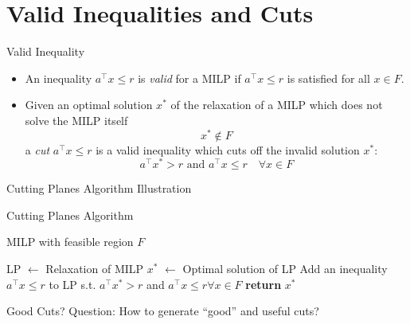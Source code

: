 \section{Valid Inequalities and Cuts}

\begin{frame}{Valid Inequality}
\begin{itemize}
	\item An inequality $a^\top x \leq r$ is \emph{valid} for a MILP if $a^\top x \leq r$ is satisfied for all $x \in F$.
	\item Given an optimal solution $x^*$ of the relaxation of a MILP which does not solve the MILP itself
	\begin{equation*}
		x^* \notin F
	\end{equation*}
	a \emph{cut} $a^\top x \leq r$ is a valid inequality which cuts off the invalid solution $x^*$:
	\begin{equation*}
		a^\top x^* > r \text{ and } a^\top x \leq r \quad \forall x \in F
	\end{equation*}
\end{itemize}

\end{frame}

\begin{frame}{Cutting Planes Algorithm}
	Illustration %
\end{frame}

\begin{frame}{Cutting Planes Algorithm}
     \begin{algorithmic}[1]
     \begin{suppresslines}
         \Input
             \State MILP with feasible region $F$
         \EndInput
     \end{suppresslines}
     \State LP $\gets$ Relaxation of MILP
     \Repeat
    	\State $x^*$ $\gets$ Optimal solution of LP 
    		\State Add an inequality $a^\top x \leq r$ to LP
    		\State s.t. $a^\top x^* > r$ and $a^\top x \leq r \forall x \in F$
    	\EndIf 
    \State \textbf{return} $x^*$
   \end{algorithmic}
\end{frame}

\begin{frame}[c]{Good Cuts?}
\centering\huge
	Question: How to generate ``good'' and useful cuts?
\end{frame}